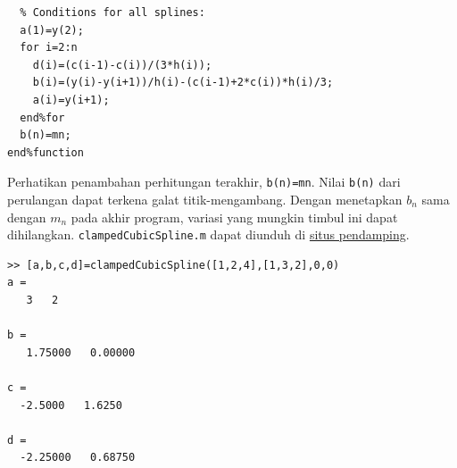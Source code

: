 \begin{description}
\begin{verbatim}
  % Conditions for all splines:
  a(1)=y(2);
  for i=2:n
    d(i)=(c(i-1)-c(i))/(3*h(i));
    b(i)=(y(i)-y(i+1))/h(i)-(c(i-1)+2*c(i))*h(i)/3;
    a(i)=y(i+1);
  end%for
  b(n)=mn;
end%function
\end{verbatim}Perhatikan penambahan perhitungan terakhir, \texttt{b(n)=mn}. Nilai
\texttt{b(n)} dari perulangan dapat terkena galat titik-mengambang.
Dengan menetapkan $b_{n}$ sama dengan $m_{n}$ pada akhir program,
variasi yang mungkin timbul ini dapat dihilangkan. \texttt{clampedCubicSpline.m}
dapat diunduh di \href{http://lqbrin.github.io/tea-time-numerical/ancillaries.html}{situs pendamping}.
\item [{\ref{exc:cubicSplines-16}:}] \begin{verbatim}
>> [a,b,c,d]=clampedCubicSpline([1,2,4],[1,3,2],0,0)
a =
   3   2

b =
   1.75000   0.00000

c =
  -2.5000   1.6250

d =
  -2.25000   0.68750
\end{verbatim}
\end{description}

